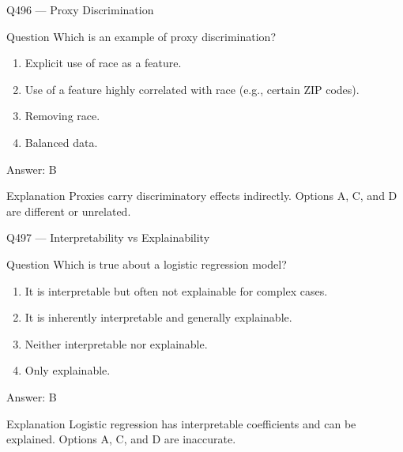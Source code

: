 \documentclass[aspectratio=169,8pt]{beamer}
\begin{document}
	\begin{frame}{Q496 --- Proxy Discrimination}
		\begin{block}{Question}
			Which is an example of proxy discrimination?
			\begin{enumerate}
				\item Explicit use of race as a feature.
				\item Use of a feature highly correlated with race (e.g., certain ZIP codes).
				\item Removing race.
				\item Balanced data.
			\end{enumerate}
		\end{block}
		\begin{exampleblock}{Answer: B}\end{exampleblock}
		\begin{block}{Explanation}
			Proxies carry discriminatory effects indirectly. Options A, C, and D are different or unrelated.
		\end{block}
	\end{frame}
	
	\begin{frame}{Q497 --- Interpretability vs Explainability}
		\begin{block}{Question}
			Which is true about a logistic regression model?
			\begin{enumerate}
				\item It is interpretable but often not explainable for complex cases.
				\item It is inherently interpretable and generally explainable.
				\item Neither interpretable nor explainable.
				\item Only explainable.
			\end{enumerate}
		\end{block}
		\begin{exampleblock}{Answer: B}\end{exampleblock}
		\begin{block}{Explanation}
			Logistic regression has interpretable coefficients and can be explained. Options A, C, and D are inaccurate.
		\end{block}
	\end{frame}
	
\end{document}
